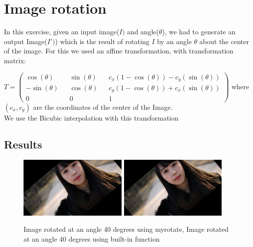 \documentclass[paper=a4, fontsize=11pt]{scrartcl} %
\numberwithin{equation}{section} %
\numberwithin{figure}{section} %
\numberwithin{table}{section} %
\begin{document}

\section{Image rotation}

In this exercise, given an input image(\(I)\) and angle(\(\theta\)), we had to generate an output Image(\(I')\)) which is the result of rotating \(I\) by an angle \(\theta\) about the center of the image. For this we used an affine transformation, with transformation matrix:

\(
  T = 
  \begin{pmatrix}
    \cos(\theta) && \sin(\theta) && c_x(1-\cos(\theta)) - c_y(\sin(\theta)) \\
    -\sin(\theta) && \cos(\theta) && c_y(1 - \cos(\theta)) + c_x(\sin(\theta)) \\
    0 && 0 && 1
  \end{pmatrix}
\) 
where \((c_x,c_y)\) are the coordinates of the center of the Image.\\
We use the Bicubic interpolation with this transformation


\subsection{Results}
  \begin{figure}[h!]   
    \centering
    \includegraphics[clip,height=3cm]{rotate40}
    \includegraphics[clip,height=3cm]{scvrotate40}
    \caption{Image rotated at an angle 40 degrees using myrotate, Image rotated at an angle 40 degrees using built-in function}
   \end{figure}
\end{document}
